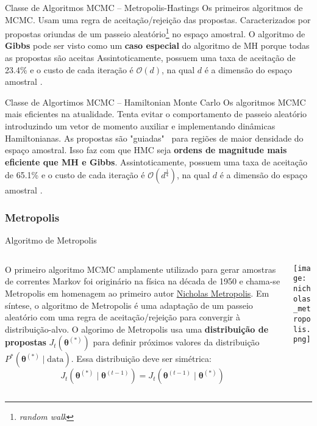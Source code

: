 \begin{frame}{Classe de Algoritmos MCMC -- Metropolis-Hastings}
  Os primeiros algoritmos de MCMC. Usam uma regra de aceitação/rejeição das
  propostas. Caracterizados por propostas oriundas de um passeio aleatório\footnote{\textit{random walk}}
  no espaço amostral. O algoritmo de \textbf{Gibbs} pode ser visto como um
  \textbf{caso especial} do algoritmo de MH porque
  todas as propostas são aceitas \parencite{gelmanIterativeNonIterativeSimulation1992}
  \vfill
  Assintoticamente, possuem uma taxa de aceitação de 23.4\% e o custo de cada iteração é
  $\mathcal{O}(d)$, na qual $d$ é a dimensão do espaço amostral \parencite{beskosOptimalTuningHybrid2013}.
\end{frame}

\begin{frame}{Classe de Algortimos MCMC -- Hamiltonian Monte Carlo}
  Os algoritmos MCMC mais eficientes na atualidade. Tenta evitar o comportamento
  de passeio aleatório introduzindo um vetor de momento auxiliar e
  implementando dinâmicas Hamiltonianas. As propostas são "guiadas"~
  para regiões de maior densidade do espaço amostral. Isso faz com que HMC seja
  \textbf{ordens de magnitude mais eficiente que MH e Gibbs}.
  \vfill
  Assintoticamente, possuem uma taxa de aceitação de 65.1\% e o custo de cada iteração é
  $\mathcal{O}(d^{\frac{1}{4}})$, na qual $d$ é a dimensão do espaço amostral \parencite{beskosOptimalTuningHybrid2013}.
\end{frame}

\subsubsection{Metropolis}
\begin{frame}{Algoritmo de Metropolis}
  \begin{columns}
    \begin{column}{0.8\textwidth}
      O primeiro algoritmo MCMC amplamente utilizado para gerar amostras de
      correntes Markov foi originário na física na década de 1950 e chama-se Metropolis
      \parencite{metropolisEquationStateCalculations1953} em homenagem ao primeiro
      autor \href{https://en.wikipedia.org/wiki/Nicholas_Metropolis}{Nicholas Metropolis}.
      \vfill
      Em síntese, o algoritmo de Metropolis é uma adaptação de um passeio aleatório
      com uma regra de aceitação/rejeição para convergir à distribuição-alvo.
      \vfill
      O algorimo de Metropolis usa uma \textbf{distribuição de propostas}
      $J_t(\boldsymbol{\theta}^{(*)})$
      para definir próximos valores da distribuição
      $P^*(\boldsymbol{\theta}^{(*)} \mid \text{data})$.
      Essa distribuição deve ser simétrica:
      $$
      J_t (\boldsymbol{\theta}^{(*)} \mid \boldsymbol{\theta}^{(t-1)}) = J_t(\boldsymbol{\theta}^{(t-1)} \mid \boldsymbol{\theta}^{(*)})
      $$
    \end{column}
    \begin{column}{0.2\textwidth}
      \centering
      \texttt{[image: nicholas\_metropolis.png]}
    \end{column}
  \end{columns}
\end{frame}


